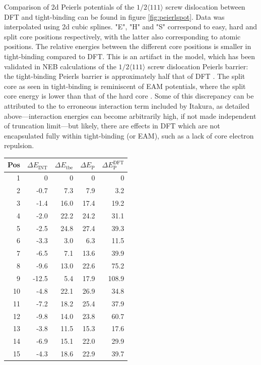 \documentclass[a4paper,11pt]{article}
\begin{document}
Comparison of 2d Peierls potentials of the \(1/2\langle 111 \rangle\) screw dislocation between DFT and
tight-binding can be found in figure \ref{fig:peierlspot}. Data was interpolated using 2d
cubic splines. "E", "H" and "S" correspond to easy, hard and split core positions
respectively, with the latter also corresponding to atomic positions. The relative energies
between the different core positions is smaller in tight-binding compared to DFT. This is an
artifact in the model, which has been validated in NEB calculations of the \(1/2\langle 111\rangle\) screw
dislocation Peierls barrier: the tight-binding Peierls barrier is approximately half that of DFT
\cite{Simpson2019}. The split core as seen in tight-binding is reminiscent of EAM potentials,
where the split core energy is lower than that of the hard core \cite{Itakura2012}. Some of
this discrepancy can be attributed to the to erroneous interaction term included by Itakura,
as detailed above---interaction energies can become arbitrarily high, if not made
independent of truncation limit---but likely, there are effects in DFT which are not
encapsulated fully within tight-binding (or EAM), such as a lack of core electron repulsion.

\begin{center}
\begin{tabular}{rrrrr}
Pos & \(\Delta E_{\text{INT}}\) & \(\Delta E_{\text{tbe}}\) & \(\Delta E_{\text{P}}\) & \(\Delta E_{\text{P}}^{\text{DFT}}\)\\
\hline
1 & 0 & 0 & 0 & 0\\
2 & -0.7 & 7.3 & 7.9 & 3.2\\
3 & -1.4 & 16.0 & 17.4 & 19.2\\
4 & -2.0 & 22.2 & 24.2 & 31.1\\
5 & -2.5 & 24.8 & 27.4 & 39.3\\
6 & -3.3 & 3.0 & 6.3 & 11.5\\
7 & -6.5 & 7.1 & 13.6 & 39.9\\
8 & -9.6 & 13.0 & 22.6 & 75.2\\
9 & -12.5 & 5.4 & 17.9 & 108.9\\
10 & -4.8 & 22.1 & 26.9 & 34.8\\
11 & -7.2 & 18.2 & 25.4 & 37.9\\
12 & -9.8 & 14.0 & 23.8 & 60.7\\
13 & -3.8 & 11.5 & 15.3 & 17.6\\
14 & -6.9 & 15.1 & 22.0 & 29.9\\
15 & -4.3 & 18.6 & 22.9 & 39.7\\
\end{tabular}
\end{center}
\end{document}
